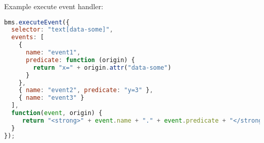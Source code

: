 %

Example execute event handler:

\begin{lstlisting}[language=JavaScript]
bms.executeEvent({
  selector: "text[data-some]",
  events: [
    { 
      name: "event1", 
      predicate: function (origin) {
        return "x=" + origin.attr("data-some") 
      }
    },
    { name: "event2", predicate: "y=3" },
    { name: "event3" } 
  ],
  function(event, origin) {
     return "<strong>" + event.name + "." + event.predicate + "</strong>";
  }
});
\end{lstlisting}
